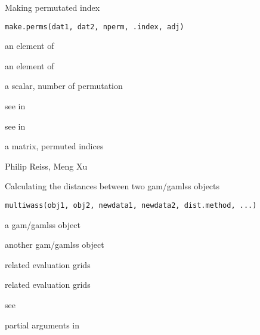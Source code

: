 \documentclass[a4paper]{book}
\begin{document}
%
\begin{Description}\relax
Making permutated index
\end{Description}
%
\begin{Usage}
\begin{verbatim}
make.perms(dat1, dat2, nperm, .index, adj)
\end{verbatim}
\end{Usage}
%
\begin{Arguments}
\begin{ldescription}
\item[\code{dat1}] an element of 

\item[\code{dat2}] an element of 

\item[\code{nperm}] a scalar, number of permutation

\item[\code{.index}] see  in 

\item[\code{adj}] see  in 
\end{ldescription}
\end{Arguments}
%
\begin{Value}
a matrix, permuted indices
\end{Value}
%
\begin{Author}\relax
Philip Reiss, Meng Xu
\end{Author}
%
\begin{SeeAlso}\relax
{}
\end{SeeAlso}
%
\begin{Description}\relax
Calculating the distances between two gam/gamlss objects
\end{Description}
%
\begin{Usage}
\begin{verbatim}
multiwass(obj1, obj2, newdata1, newdata2, dist.method, ...)
\end{verbatim}
\end{Usage}
%
\begin{Arguments}
\begin{ldescription}
\item[\code{obj1}] a gam/gamlss object

\item[\code{obj2}] another gam/gamlss object

\item[\code{newdata1}] related evaluation grids

\item[\code{newdata2}] related evaluation grids

\item[\code{dist.method}] see 

\item[\code{...}] partial arguments in 
\end{ldescription}
\end{Arguments}
\end{document}

